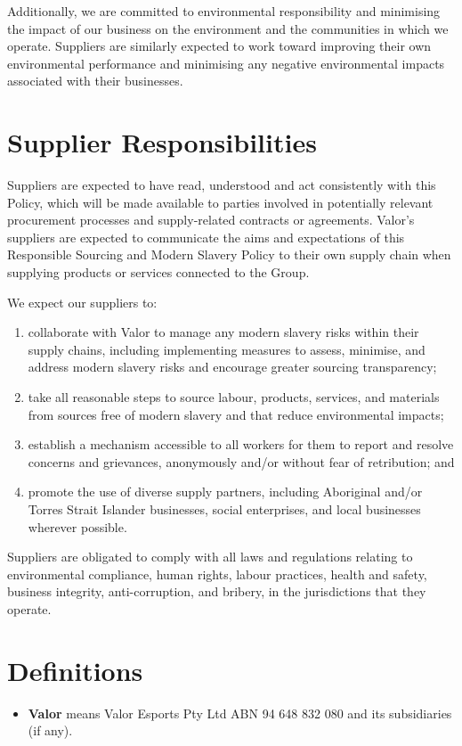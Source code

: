 \documentclass[10pt]{article}
\begin{document}
Additionally, we are committed to environmental responsibility and minimising the impact of our business on the environment and the communities in which we operate. Suppliers are similarly expected to work toward improving their own environmental performance and minimising any negative environmental impacts associated with their businesses.


\section{Supplier Responsibilities}
\label{supplierresponsibilities}

Suppliers are expected to have read, understood and act consistently with this Policy, which will be made available to parties involved in potentially relevant procurement processes and supply-related contracts or agreements. Valor's suppliers are expected to communicate the aims and expectations of this Responsible Sourcing and Modern Slavery Policy to their own supply chain when supplying products or services connected to the Group.

We expect our suppliers to:
\begin{enumerate}[(1)]
	\item collaborate with Valor to manage any modern slavery risks within their supply chains, including implementing measures to assess, minimise, and address modern slavery risks and encourage greater sourcing transparency;
	\item take all reasonable steps to source labour, products, services, and materials from sources free of modern slavery and that reduce environmental impacts;
	\item establish a mechanism accessible to all workers for them to report and resolve concerns and grievances, anonymously and/or without fear of retribution; and
	\item promote the use of diverse supply partners, including Aboriginal and/or Torres Strait Islander businesses, social enterprises, and local businesses wherever possible.
\end{enumerate}

Suppliers are obligated to comply with all laws and regulations relating to environmental compliance, human rights, labour practices, health and safety, business integrity, anti-corruption, and bribery, in the jurisdictions that they operate.


\section{Definitions}
\begin{itemize}
	\item[]	
	\textbf{Valor} means Valor Esports Pty Ltd ABN 94 648 832 080 and its subsidiaries (if any).
\end{itemize}
\end{document}
